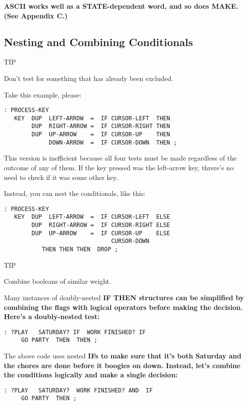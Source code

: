 \bf{ASCII} works well as a STATE-dependent word, and so does \bf{MAKE}.
(See Appendix C.)

\subsection{Nesting and Combining Conditionals}

TIP

Don't test for something that has already been excluded.

Take this example, please:

\begin{verbatim}
: PROCESS-KEY
   KEY  DUP  LEFT-ARROW  =  IF CURSOR-LEFT  THEN
        DUP  RIGHT-ARROW =  IF CURSOR-RIGHT THEN
        DUP  UP-ARROW    =  IF CURSOR-UP    THEN
             DOWN-ARROW  =  IF CURSOR-DOWN  THEN ;
\end{verbatim}

This version is inefficient because all four tests must be made regardless
of the outcome of any of them. If the key pressed was the left-arrow key,
threre's no need to check if it was some other key.

Instead, you can nest the conditionals, like this:

\begin{verbatim}
: PROCESS-KEY
   KEY  DUP  LEFT-ARROW  =  IF CURSOR-LEFT  ELSE
        DUP  RIGHT-ARROW =  IF CURSOR-RIGHT ELSE
        DUP  UP-ARROW    =  IF CURSOR-UP    ELSE
                               CURSOR-DOWN
           THEN THEN THEN  DROP ;
\end{verbatim}

TIP

Combine booleans of similar weight.

Many instances of doubly-nested \bf{IF THEN} structures can be simplified
by combining the flags with logical operators before making the decision.
Here's a doubly-nested test:

\begin{verbatim}
: ?PLAY   SATURDAY? IF  WORK FINISHED? IF
     GO PARTY  THEN  THEN ;
\end{verbatim}

The above code uses nested \bf{IF}s to make sure that it's both Saturday and
the chores are done before it boogies on down. Instead, let's combine the
conditions logically and make a single decision:

\begin{verbatim}
: ?PLAY   SATURDAY?  WORK FINISHED? AND  IF
     GO PARTY  THEN ;
\end{verbatim}

